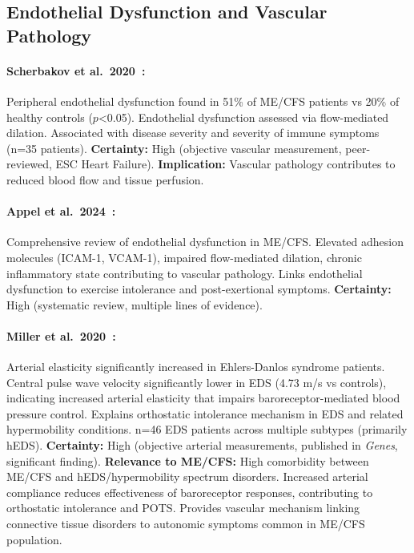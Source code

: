 \subsection{Endothelial Dysfunction and Vascular Pathology}

\paragraph{Scherbakov et al.\ 2020~\cite{Scherbakov2020}:}
Peripheral endothelial dysfunction found in 51\% of ME/CFS patients vs 20\% of healthy controls ($p$<0.05). Endothelial dysfunction assessed via flow-mediated dilation. Associated with disease severity and severity of immune symptoms (n=35 patients). \textbf{Certainty:} High (objective vascular measurement, peer-reviewed, ESC Heart Failure). \textbf{Implication:} Vascular pathology contributes to reduced blood flow and tissue perfusion.

\paragraph{Appel et al.\ 2024~\cite{Appel2025}:}
Comprehensive review of endothelial dysfunction in ME/CFS. Elevated adhesion molecules (ICAM-1, VCAM-1), impaired flow-mediated dilation, chronic inflammatory state contributing to vascular pathology. Links endothelial dysfunction to exercise intolerance and post-exertional symptoms. \textbf{Certainty:} High (systematic review, multiple lines of evidence).

\paragraph{Miller et al.\ 2020~\cite{Miller2020arterial}:}
Arterial elasticity significantly increased in Ehlers-Danlos syndrome patients. Central pulse wave velocity significantly lower in EDS (4.73 m/s vs controls), indicating increased arterial elasticity that impairs baroreceptor-mediated blood pressure control. Explains orthostatic intolerance mechanism in EDS and related hypermobility conditions. n=46 EDS patients across multiple subtypes (primarily hEDS). \textbf{Certainty:} High (objective arterial measurements, published in \textit{Genes}, significant finding). \textbf{Relevance to ME/CFS:} High comorbidity between ME/CFS and hEDS/hypermobility spectrum disorders. Increased arterial compliance reduces effectiveness of baroreceptor responses, contributing to orthostatic intolerance and POTS. Provides vascular mechanism linking connective tissue disorders to autonomic symptoms common in ME/CFS population.

